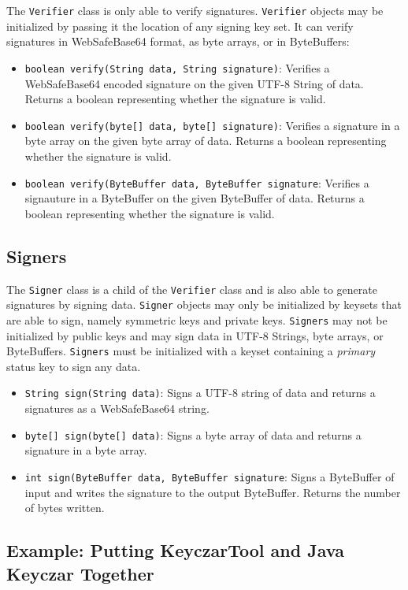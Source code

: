 \documentclass{llncs}
\begin{document}
The {\tt Verifier} class is only able to verify signatures. {\tt Verifier}
objects may be initialized by passing it the location of any signing key set.
It can verify signatures in WebSafeBase64 format, as byte arrays, or in
ByteBuffers:
\begin{itemize}
  \item {\tt boolean verify(String data, String signature)}: Verifies a
  WebSafeBase64 encoded signature on the given UTF-8 String of data. Returns a
  boolean representing whether the signature is valid.
  \item {\tt boolean verify(byte[] data, byte[] signature)}: Verifies a
  signature in a byte array on the given byte array of data. Returns a
  boolean representing whether the signature is valid. 
  \item {\tt boolean verify(ByteBuffer data, ByteBuffer signature}: Verifies a
  signauture in a ByteBuffer on the given ByteBuffer of data. Returns a boolean
  representing whether the signature is valid.
\end{itemize}

\subsection{Signers}

The {\tt Signer} class is a child of the {\tt Verifier} class and is also able
to generate signatures by signing data. {\tt Signer} objects may only be
initialized by keysets that are able to sign, namely symmetric keys and private
keys. {\tt Signers} may not be initialized by public keys and may sign data in
UTF-8 Strings, byte arrays, or ByteBuffers. {\tt Signers} must be initialized
with a keyset containing a {\it primary} status key to sign any data.
\begin{itemize}
  \item {\tt String sign(String data)}: Signs a UTF-8 string of data and
  returns a signatures as a WebSafeBase64 string.
  \item {\tt byte[] sign(byte[] data)}: Signs a byte array of data and returns
  a signature in a byte array.
  \item {\tt int sign(ByteBuffer data, ByteBuffer signature}: Signs a
  ByteBuffer of input and writes the signature to the output ByteBuffer.
  Returns the number of bytes written.
\end{itemize}

\subsection{Example: Putting KeyczarTool and Java Keyczar Together}
\end{document}
